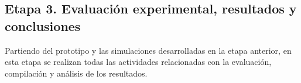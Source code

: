 \documentclass[sigconf]{acmart}
\begin{document}
  \subsection*{Etapa 3. Evaluaci\'{o}n experimental, resultados y conclusiones}
  
  Partiendo del prototipo y las simulaciones desarrolladas en la etapa anterior, en esta etapa se realizan todas las actividades relacionadas con la evaluación, compilación y análisis de los resultados.

  
  






\end{document}

